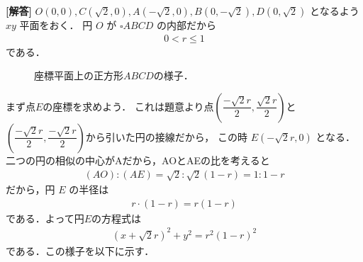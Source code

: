 \documentclass[../../main.tex]{subfiles}
\begin{document}
\begin{oframed}
  
\end{oframed}

{\bf [解答]}
$O(0,0), C(\sqrt{2},0), A(-\sqrt{2},0), B(0,-\sqrt{2}), D(0, \sqrt{2})$ となるよう $xy$ 平面をおく．
円 $O$ が $\square ABCD$ の内部だから
\begin{align}
  0 < r \le 1 \label{eq:1}
\end{align}
である．

\begin{figure}[htb]
  \begin{center}
    \caption{座標平面上の正方形$ABCD$の様子．}
  \end{center}
\end{figure}

まず点$E$の座標を求めよう．
これは題意より点$\left(\dfrac{-\sqrt{2}r}{2},\dfrac{\sqrt{2}r}{2}\right)$と$\left(\dfrac{-\sqrt{2}r}{2},\dfrac{-\sqrt{2}r}{2}\right)$から引いた円の接線だから，
この時 $E(-\sqrt{2}r, 0)$ となる．二つの円の相似の中心がAだから，AOとAEの比を考えると
\begin{align}
  (AO) : (AE) = \sqrt{2} : \sqrt{2}(1-r) = 1 : 1-r
\end{align}
だから，円 $E$ の半径は
\begin{align}
  r\cdot(1-r) = r(1-r)
\end{align}
である．よって円$E$の方程式は
\begin{align}
  (x + \sqrt{2}r)^2 + y^2 = r^2(1-r)^2 \label{eq:2}
\end{align}
である．この様子を以下に示す．
\end{document}
